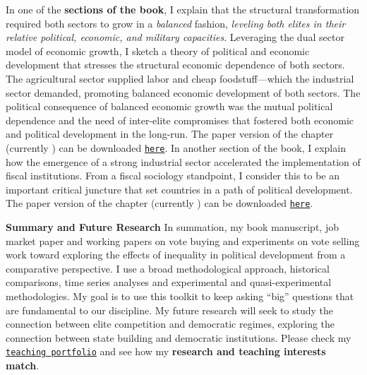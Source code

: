\documentclass[10pt,stdletter,dateno,sigleft]{newlfm} %
\begin{document}
\begin{newlfm}
In one of the {\bf sections of the book}, I explain that the structural transformation required both sectors to grow in a \emph{balanced} fashion, \emph{leveling both elites in their relative political, economic, and military capacities}. Leveraging the dual sector model of economic growth, I sketch a theory of political and economic development that stresses the structural economic dependence of both sectors. The agricultural sector supplied labor and cheap foodstuff---which the industrial sector demanded, promoting balanced economic development of both sectors. The political consequence of balanced economic growth was the mutual political dependence and the need of inter-elite compromises that fostered both economic and political development in the long-run. The paper version of the chapter (currently \emph{\unskip}) can be downloaded \href{https://github.com/hbahamonde/Negative_Link_Paper/raw/master/Bahamonde_NegativeLink.pdf}{\texttt{here}}. In another section of the book, I explain how the emergence of a strong industrial sector accelerated the implementation of fiscal institutions. From a fiscal sociology standpoint, I consider this to be an important critical juncture that set countries in a path of political development. The paper version of the chapter (currently \emph{\unskip}) can be downloaded \href{http://github.com/hbahamonde/IncomeTaxAdoption/raw/master/Bahamonde_IncomeTaxAdoption.pdf}{\texttt{here}}. 


{\bf Summary and Future Research} In summation, my book manuscript, job market paper and working papers on vote buying and experiments on vote selling work toward exploring the effects of inequality in political development from a comparative perspective. I use a broad methodological approach, historical comparisons, time series analyses and experimental and quasi-experimental methodologies. My goal is to use this toolkit to keep asking ``big'' questions that are fundamental to our discipline. My future research will seek to study the connection between elite competition and democratic regimes, exploring the connection between state building and democratic institutions. Please check my \href{http://www.hectorbahamonde.com/teaching/}{\texttt{teaching portfolio}} and see how my {\bf research and teaching interests match}.


{\unskip}


\vspace{-10cm}



\end{newlfm}
\end{document}

